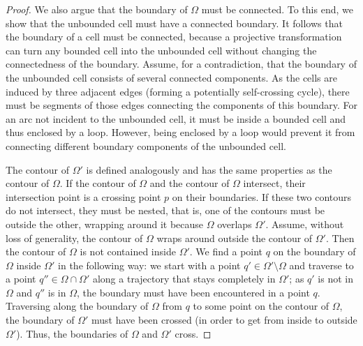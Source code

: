 \documentclass[a4paper,UKenglish,cleveref, autoref, thm-restate]{lipics_arxiv}
\begin{document}
\begin{proof}
We also argue that the boundary of $\Omega$ must be connected. To this end, we show that the unbounded cell must have a connected boundary. It follows that the boundary of a cell must be connected, because a projective transformation can turn any bounded cell into the unbounded cell without changing the connectedness of the boundary. Assume, for a contradiction, that the boundary of the unbounded cell consists of several connected components. As the cells are induced by three adjacent edges (forming a potentially self-crossing cycle), there must be segments of those edges connecting the components of this boundary. For an arc not incident to the unbounded cell, it must be inside a bounded cell and thus enclosed by a loop. However, being enclosed by a loop would prevent it from connecting different boundary components of the unbounded cell.

The contour of $\Omega'$ is defined analogously and has the same properties as the contour of $\Omega$. If the contour of $\Omega$ and the contour of $\Omega$ intersect, their intersection point is a crossing point $p$ on their boundaries. If these two contours do not intersect, they must be nested, that is, one of the contours must be outside the other, wrapping around it because $\Omega$ overlaps $\Omega'$. Assume, without loss of generality, the contour of $\Omega$ wraps around outside the contour of $\Omega'$. Then the contour of $\Omega$ is not contained inside $\Omega'$. We find a point $q$ on the boundary of $\Omega$ inside $\Omega'$ in the following way: we start with a point $q' \in \Omega' \setminus \Omega$ and traverse to a point $q'' \in \Omega \cap \Omega'$ along a trajectory that stays completely in $\Omega'$; as $q'$ is not in $\Omega$ and $q''$ is in $\Omega$, the boundary must have been encountered in a point $q$. Traversing along the boundary of $\Omega$ from $q$ to some point on the contour of $\Omega$, the boundary of $\Omega'$ must have been crossed (in order to get from inside to outside $\Omega'$). Thus, the boundaries of $\Omega$ and $\Omega'$ cross.
\end{proof}
\end{document}
